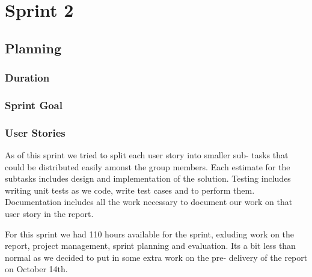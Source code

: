 \chapter{Sprint 2}
\section{Planning}
\subsection{Duration}
\subsection{Sprint Goal}
\subsection{User Stories}
As of this sprint we tried to split each user story into smaller sub- tasks that could be distributed easily amonst the group members. Each estimate for the subtasks includes design and implementation of the solution. Testing includes writing unit tests as we code, write test cases and to perform them. Documentation includes all the work necessary to document our work on that user story in the report.

For this sprint we had 110 hours available for the sprint, exluding work on the report, project management, sprint planning and evaluation. Its a bit less than normal as we decided to put in some extra work on the pre- delivery of the report on October 14th.

